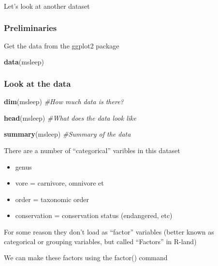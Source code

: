 \documentclass[]{book}
\newenvironment{Shaded}{\begin{snugshade}}{\end{snugshade}}
\newcommand{\KeywordTok}[1]{\textcolor[rgb]{0.13,0.29,0.53}{\textbf{#1}}}
\newcommand{\StringTok}[1]{\textcolor[rgb]{0.31,0.60,0.02}{#1}}
\newcommand{\CommentTok}[1]{\textcolor[rgb]{0.56,0.35,0.01}{\textit{#1}}}
\newcommand{\OperatorTok}[1]{\textcolor[rgb]{0.81,0.36,0.00}{\textbf{#1}}}
\newcommand{\NormalTok}[1]{#1}
\providecommand{\tightlist}{%
  \setlength{\itemsep}{0pt}\setlength{\parskip}{0pt}}
\theoremstyle{definition}
\theoremstyle{definition}
\theoremstyle{definition}
\theoremstyle{remark}
\begin{document}
Let's look at another dataset

\subsubsection{Preliminaries}\label{preliminaries}

Get the data from the ggplot2 package

\begin{Shaded}
\begin{Highlighting}[]
\KeywordTok{data}\NormalTok{(msleep)}
\end{Highlighting}
\end{Shaded}

\subsubsection{Look at the data}\label{look-at-the-data}

\begin{Shaded}
\begin{Highlighting}[]
\KeywordTok{dim}\NormalTok{(msleep) }\CommentTok{#How much data is there?}

\KeywordTok{head}\NormalTok{(msleep) }\CommentTok{#What does the data look like}

\KeywordTok{summary}\NormalTok{(msleep) }\CommentTok{#Summary of the data}
\end{Highlighting}
\end{Shaded}

There are a number of ``categorical'' varibles in this dataset

\begin{itemize}
\tightlist
\item
  genus
\item
  vore = carnivore, omnivore et
\item
  order = taxonomic order
\item
  conservation = conservation status (endangered, etc)
\end{itemize}

For some reason they don't load as ``factor'' variables (better known as
categorical or grouping variables, but called ``Factors'' in R-land)

We can make these factors using the factor() command

\begin{Shaded}
\end{Shaded}
\end{document}
